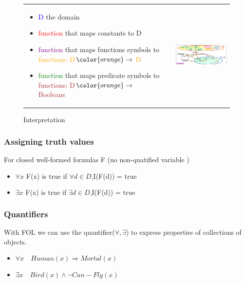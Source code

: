  \begin{figure}[h]
     \begin{tabular}{m{7.5cm}m{1cm}m{8cm}}
     \begin{itemize}
         \item \textcolor{blue}{D} the domain
         \item \textcolor{red}{function} that maps constants to D
         \item \textcolor{purple}{function} that maps functions symbols to 
             \textcolor{orange}{functions: D$\color{orange}\to$ D}
         \item \textcolor{green}{function} that maps predicate symbols to 
             \textcolor{brown}{functions: D$\color{orange}\to$ Booleans}
     \end{itemize}
     &&
     \includegraphics[width=8cm]{fol_inter.png}
 \end{tabular}
 \caption{Interpretation}
 \end{figure}

 \subsubsection{Assigning truth values}

 For closed well-formed formulas F (no non-quatified variable )

	\begin{itemize}
		\item $\forall x$ F(x) is true if $\forall d\in D$,I(F(d)) = true
		\item $\exists x$ F(x) is true if $\exists d\in D$,I(F(d)) = true
	\end{itemize}



    \subsubsection{Quantifiers}

 With  FOL  we  can  use the  quantifier($\forall,\exists$)  to  express
properties of collections of objects.

	\begin{itemize}
		\item $\forall x\quad Human(x) \Rightarrow Mortal(x)$
		\item $\exists x \quad Bird(x) \wedge \neg Can-Fly(x)$
	\end{itemize}


